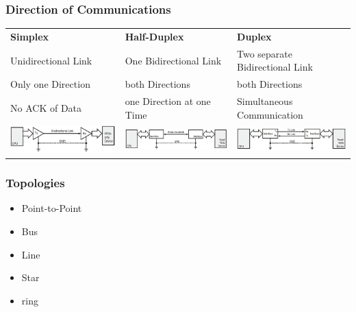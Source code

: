 \subsubsection{Direction of Communications}
\begin{tabular}{lll}
	\textbf{Simplex}&\textbf{Half-Duplex} &\textbf{Duplex}\\
	Unidirectional Link&  One Bidirectional Link& Two separate Bidirectional Link\\
	Only one Direction & both Directions & both Directions\\
	No ACK of Data & one Direction at one Time & Simultaneous Communication\\
	\includegraphics[width=6cm]{images/simplex.png}& \includegraphics[width=6cm]{images/half_duplex.png}&
	\includegraphics[width=6cm]{images/duplex.png}\\
\end{tabular}	
\subsubsection{Topologies}
\begin{itemize}
	\item Point-to-Point
	\item Bus
	\item Line
	\item Star
	\item ring
\end{itemize}	
\clearpage
\pagebreak
